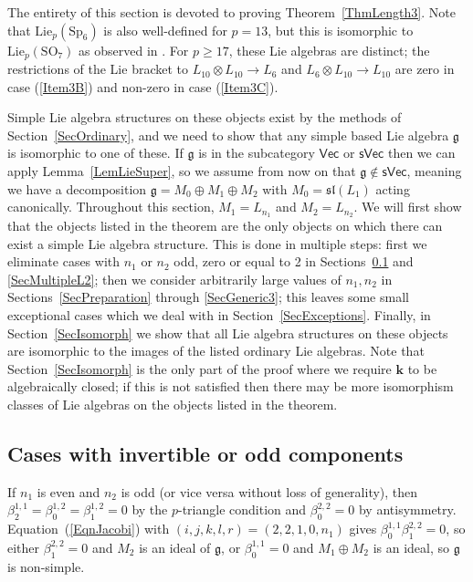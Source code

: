 \documentclass[11pt,a4paper,reqno]{amsart}
\theoremstyle{definition}
\newcommand{\bk}{\mathbf{k}}
\numberwithin{equation}{section}
\newcommand{\fg}{\mathfrak{g}}
\newcommand{\fsl}{\mathfrak{sl}}
\newcommand{\Lie}{\mathrm{Lie}}
\newcommand{\Vecc}{\mathsf{Vec}}
\newcommand{\sVec}{\mathsf{sVec}}
\newcommand{\SO}{\mathrm{SO}}
\newcommand{\Sp}{\mathrm{Sp}}
\begin{document}
The entirety of this section is devoted to proving Theorem~\ref{ThmLength3}. Note that $\Lie_p(\Sp_6)$ is also well-defined for $p=13$, but this is isomorphic to $\Lie_p(\SO_7)$ as observed in \cite[Proposition~4.3.2(3)]{CEN}. For $p\geq17$, these Lie algebras are distinct; the restrictions of the Lie bracket to $L_{10}\otimes L_{10}\to L_6$ and $L_6\otimes L_{10}\to L_{10}$ are zero in case (\ref{Item3B}) and non-zero in case (\ref{Item3C}).

Simple Lie algebra structures on these objects exist by the methods of Section~\ref{SecOrdinary}, and we need to show that any simple based Lie algebra $\fg$ is isomorphic to one of these. If $\fg$ is in the subcategory $\Vecc$ or $\sVec$ then we can apply Lemma~\ref{LemLieSuper}, so we assume from now on that $\fg\not\in\sVec$, meaning we have a decomposition $\fg=M_0\oplus M_1\oplus M_2$ with $M_0=\fsl(L_1)$ acting canonically. Throughout this section, $M_1=L_{n_1}$ and $M_2=L_{n_2}$. We will first show that the objects listed in the theorem are the only objects on which there can exist a simple Lie algebra structure. This is done in multiple steps: first we eliminate cases with $n_1$ or $n_2$ odd, zero or equal to 2 in Sections~\ref{SecOddInv} and \ref{SecMultipleL2}; then we consider arbitrarily large values of $n_1,n_2$ in Sections~\ref{SecPreparation} through \ref{SecGeneric3}; this leaves some small exceptional cases which we deal with in Section~\ref{SecExceptions}. Finally, in Section~\ref{SecIsomorph} we show that all Lie algebra structures on these objects are isomorphic to the images of the listed ordinary Lie algebras. Note that Section~\ref{SecIsomorph} is the only part of the proof where we require $\bk$ to be algebraically closed; if this is not satisfied then there may be more isomorphism classes of Lie algebras on the objects listed in the theorem.

\subsection{Cases with invertible or odd components}\label{SecOddInv} If $n_1$ is even and $n_2$ is odd (or vice versa without loss of generality), then $\beta^{1,1}_2=\beta^{1,2}_0=\beta^{1,2}_1=0$ by the $p$-triangle condition and $\beta^{2,2}_0=0$ by antisymmetry. Equation~(\ref{EqnJacobi}) with $(i,j,k,l,r)=(2,2,1,0,n_1)$ gives $\beta^{1,1}_0\beta^{2,2}_1=0$, so either $\beta^{2,2}_1=0$ and $M_2$ is an ideal of $\fg$, or $\beta^{1,1}_0=0$ and $M_1\oplus M_2$ is an ideal, so $\fg$ is non-simple.
\end{document}
